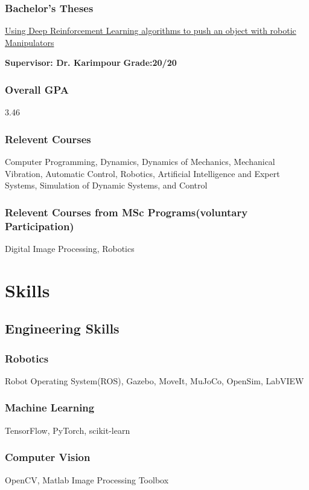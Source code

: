 \documentclass[a4paper]{article}
\begin{document}
        \subsubsection{Bachelor's Theses}
        \href{https://github.com/ake1999/aarm}{Using Deep Reinforcement Learning algorithms to push an object with robotic Manipulators} 

        {\bfseries\small Supervisor: Dr. Karimpour}
        \hfill
        {\bfseries\small Grade:20/20}

        \subsubsection{Overall GPA}
        3.46

        \subsubsection{Relevent Courses}
        Computer Programming, Dynamics, Dynamics of Mechanics, Mechanical Vibration, Automatic Control, Robotics, Artificial Intelligence and Expert Systems, Simulation of Dynamic Systems, and Control

        \subsubsection{Relevent Courses from MSc Programs(voluntary Participation)}
        Digital Image Processing, Robotics

    \section{Skills}
        \subsection{Engineering Skills}
        \subsubsection{Robotics}
        Robot Operating System(ROS), Gazebo, MoveIt, MuJoCo, OpenSim, LabVIEW
        \subsubsection{Machine Learning}
        TensorFlow, PyTorch, scikit-learn
        \subsubsection{Computer Vision}
        OpenCV, Matlab Image Processing Toolbox
\end{document}

